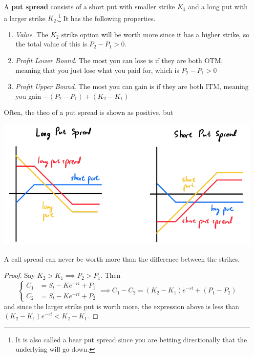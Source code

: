 \documentclass{article}
\begin{document}
    \begin{definition}
      A \textbf{put spread} consists of a short put with smaller strike $K_1$ and a long put with a larger strike $K_2$.\footnote{It is also called a bear put spread since you are betting directionally that the underlying will go down. } It has the following properties. 
      \begin{enumerate}
        \item \textit{Value}. The $K_2$ strike option will be worth more since it has a higher strike, so the total value of this is $P_2 - P_1 > 0$. 
        \item \textit{Profit Lower Bound}. The most you can lose is if they are both OTM, meaning that you just lose what you paid for, which is $P_2 - P_1 > 0$
        \item \textit{Profit Upper Bound}. The most you can gain is if they are both ITM, meaning you gain $-(P_2 - P_1) + (K_2 - K_1)$
      \end{enumerate}
      Often, the theo of a put spread is shown as positive, but 
      \begin{center}
        \includegraphics[scale=0.3]{img/put_spread.png}
      \end{center}
    \end{definition}

    \begin{theorem}
      A call spread can never be worth more than the difference between the strikes. 
    \end{theorem}
    \begin{proof}
      Say $K_2 > K_1 \implies P_2 > P_1$. Then 
      \begin{equation}
        \begin{cases}  C_1 & = S_t - K e^{-rt} + P_1 \\ C_2 & = S_t - K e^{-rt} + P_2 \end{cases} \implies C_1 - C_2 = (K_2 - K_1) e^{-rt} + (P_1 - P_2) 
      \end{equation}
      and since the larger strike put is worth more, the expression above is less than $(K_2 - K_1) e^{-rt} < K_2 - K_1$. 
    \end{proof}
\end{document}
